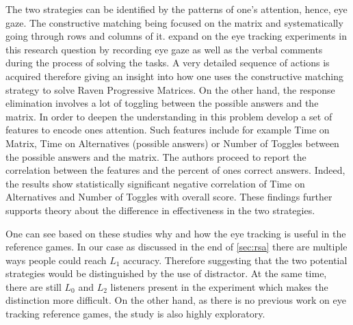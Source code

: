 The two strategies can be identified by the patterns of one's attention, hence, eye gaze. The constructive matching being focused on the matrix and systematically going through rows and columns of it. \cite{Carpenter_1990} expand on the eye tracking experiments in this research question by recording eye gaze as well as the verbal comments during the process of solving the tasks. A very detailed sequence of actions is acquired therefore giving an insight into how one uses the constructive matching strategy to solve Raven Progressive Matrices. On the other hand, the response elimination involves a lot of toggling between the possible answers and the matrix. In order to deepen the understanding in this problem \cite{Vigneau_2006} develop a set of features to encode ones attention. Such features include for example Time on Matrix, Time on Alternatives (possible answers) or Number of Toggles between the possible answers and the matrix. The authors proceed to report the correlation between the features and the percent of ones correct answers. Indeed, the results show statistically significant negative correlation of Time on Alternatives and Number of Toggles with overall score. These findings further supports theory about the difference in effectiveness in the two strategies. 


One can see based on these studies why and how the eye tracking is useful in the reference games. In our case as discussed in the end of \autoref{sec:rsa} there are multiple ways people could reach $L_1$ accuracy. Therefore suggesting that the two potential strategies would be distinguished by the use of distractor. At the same time, there are still $L_0$ and $L_2$ listeners present in the experiment which makes the distinction more difficult. On the other hand, as there is no previous work on eye tracking reference games, the study is also highly exploratory.

